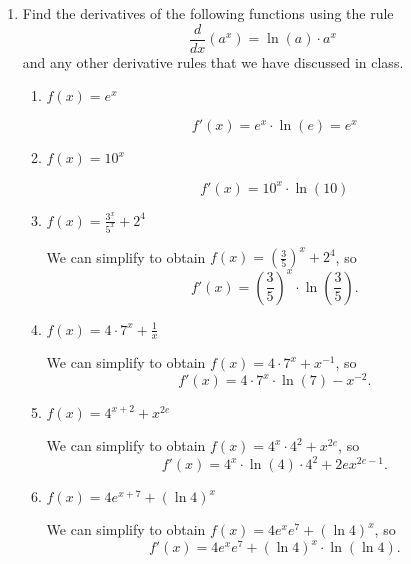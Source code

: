 \documentclass[11pt]{article}
\begin{document}
\drawtitle

\begin{enumerate}
\item Find the derivatives of the following functions using the rule
  \[
  \frac{d}{dx}\left(a^x\right)=\ln(a)\cdot a^x
  \]
  and any other derivative rules that we have discussed in class.
  \begin{enumerate}
  \item $\displaystyle f(x)=e^x$ \vfill
    {\color{blue}

      \[
      f'(x) = e^x\cdot\ln(e) = e^x
      \]

    }
    \vfill

  \item $\displaystyle f(x)=10^x$ \vfill
    {\color{blue}

      \[
      f'(x) = 10^x\cdot\ln(10)
      \]

    }
    \vfill

    \newpage
  \item $\displaystyle f(x)=\frac{3^x}{5^x}+2^4$ \vfill 
    {\color{blue}

      We can simplify to obtain $f(x) = \left(\frac{3}{5}\right)^x +
      2^4$, so
      \[
      f'(x) = \left(\frac{3}{5}\right)^x\cdot \ln\left(\frac{3}{5}\right).
      \]

    }
    \vfill

  \item $\displaystyle f(x)=4\cdot 7^x+\frac{1}{x}$ \vfill
    {\color{blue}

      We can simplify to obtain $f(x) = 4\cdot 7^x + x^{-1}$, so
      \[
      f'(x) = 4\cdot7^x\cdot\ln(7) - x^{-2}.
      \]

    }
    \vfill

    \newpage
  \item $\displaystyle f(x)=4^{x+2}+x^{2e}$ \vfill
    {\color{blue}

      We can simplify to obtain $f(x) = 4^x\cdot 4^2 + x^{2e}$, so
      \[
      f'(x) = 4^x\cdot\ln(4)\cdot 4^2 + 2ex^{2e-1}.
      \]

    }
    \vfill

  \item $\displaystyle f(x)=4e^{x+7}+(\ln 4)^x$\vfill
    {\color{blue}

      We can simplify to obtain $f(x) = 4e^xe^7+(\ln 4)^x$, so
      \[
      f'(x) = 4e^xe^7 + (\ln 4)^x\cdot\ln\left(\ln 4\right).
      \]

    }
    \vfill


\end{enumerate}
\end{enumerate}
\end{document}
